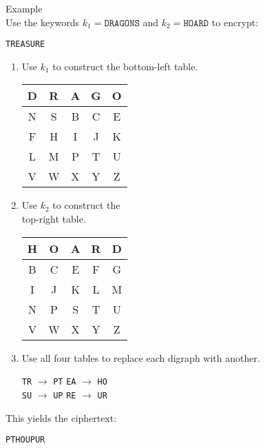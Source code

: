 \begin{minipage}{6cm}\raggedright
\textsf{\LARGE Example}\\[1.0ex]
Use the keywords $k_1=\texttt{DRAGONS}$ and $k_2=\texttt{HOARD}$ to encrypt:
\begin{center}
\texttt{TREASURE}\\[1.25ex]
\end{center}

\begin{enumerate}[leftmargin=*]
\item Use $k_1$ to construct the bottom-left table.

\ttfamily
\begin{center}
\begin{tabular}{*{5}{|c}|}\hline
D & R & A & G & O \\\hline
N & S & B & C & E \\\hline
F & H & I & J & K \\\hline
L & M & P & T & U \\\hline
V & W & X & Y & Z \\\hline
\end{tabular}
\end{center}
\rmfamily

\item Use $k_2$ to construct the\\top-right table.

\ttfamily
\begin{center}
\begin{tabular}{*{5}{|c}|}\hline
H & O & A & R & D \\\hline
B & C & E & F & G \\\hline
I & J & K & L & M \\\hline
N & P & S & T & U \\\hline
V & W & X & Y & Z \\\hline
\end{tabular}
\end{center}
\rmfamily

\item Use all four tables to replace each digraph with another.
\begin{center}
\texttt{TR} $\rightarrow$ \texttt{PT} \qquad \texttt{EA} $\rightarrow$ \texttt{HO}\\
\texttt{SU} $\rightarrow$ \texttt{UP} \qquad \texttt{RE} $\rightarrow$ \texttt{UR}
\end{center}
\end{enumerate}

This yields the ciphertext:
\begin{center}
\texttt{PTHOUPUR}
\end{center}
\end{minipage}